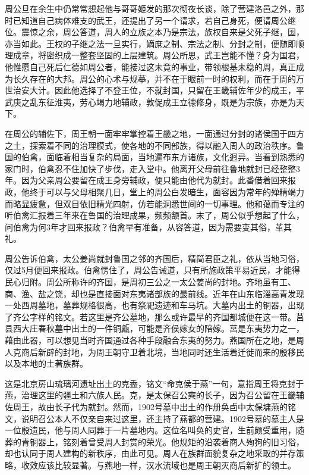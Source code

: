 周公旦在余生中仍常常想起他与哥哥姬发的那次彻夜长谈，除了营建洛邑之外，那时已知道自己病体难支的武王，还提出了另一个请求，若自己身死，便请周公继位。震惊之余，周公答道，周人的立族之本乃是宗法，族权自来是父死子继，国，亦当如此。王权的子继之法一旦实行，嫡庶之制、宗法之制、分封之制，便随即顺理成章，将密织成一整套坚固的上层建筑。周公所思，武王岂能不懂？身为国君，他惟愿自己死后仁德如周公者，能接过这未竟的事业，带领根基未稳的周，真正成为长久存在的大邦。周公的心术与规摹，并不在于眼前一时的权利，而在于周的万世治安大计。因此他选择了不登王位，不就封国，只留在王畿辅佐年少的成王，平武庚之乱东征淮夷，劳心竭力地辅政，敦促成王立德修身，既是为宗族，亦是为天下。

在周公的辅佐下，周王朝一面牢牢掌控着王畿之地，一面通过分封的诸侯国于四方之土，探索着不同的治理模式，使各地的不同部族，得以融入周人的政治秩序。鲁国的伯禽，面临着相当复杂的局面，当地遍布东方诸族，文化迥异。当看到熟悉的家门时，伯禽忍不住加快了步伐，走入堂中。他离开父母前往鲁地就封已经整整3年。因为父亲周公要留在成王身旁辅政，便只能由他代为就封。此番借着回来报政，他终于可以与父母相聚几日，堂上的周公白发暗生，面容因为常年的殚精竭力而略显疲惫，但双目依旧精光四射，仿若能洞悉世间的一切事理。他和蔼而专注的听伯禽汇报着三年来在鲁国的治理成果，频频颔首。末了，周公似乎想起了什么，问伯禽为何3年才回来报政？伯禽早有准备，从容答道，因为需要变其俗，革其礼。

周公告诉伯禽，太公姜尚就封鲁国之邻的齐国后，精简君臣之礼，依从当地习俗，仅过5月便回来报政。伯禽愣住了，周公告诫道，只有所施政策平易近民，才能得民心归附。周公所称许的齐国，是周初三公之一太公姜尚的封地。齐地虽有工、商、渔、盐之饶，却也是直接面对东夷诸部族的最前线。近年在山东临淄高青发现一处西周墓地，墓葬规格很高，也有祭祀遗迹和车马坑。大墓内出土的铜器，出现了齐公字样的铭文。若这里是齐公墓地，那么或许最早的齐国都城便在这一带。莒县西大庄春秋墓中出土的一件铜甗，可能是齐侯嫁女的陪嫁。莒是东夷势力之一，藉由此器，可以想见当时齐国通过各种手段融合东夷的努力。燕国所在之地，是周人克商后新辟的封地，为周王朝守卫着北境，当地同时还生活着迁徙而来的殷移民以及本地的土著族群。

这是北京房山琉璃河遗址出土的克盉，铭文“命克侯于燕”一句，意指周王将克封于燕，治理这里的疆土和六族人民。克，是太保召公奭的长子，因为召公留在王畿辅佐周王，故由长子代为就封。然而，1902号墓中出土的作册奂卣中太保墉燕的铭文，说明召公本人不仅亲自来过这里，还主持了燕都的营建。1902号墓的墓主人是一位殷遗民，他与周人同葬于一片墓地内。这位名叫奂的史官，生前颇受重用，随葬的青铜器上，铭刻着曾受周人封赏的荣光。他规矩的沿袭着商人殉狗的旧习俗，却也认同于周人建构的新秩序，由此可见。周人在族群面貌复杂之地采取的并存策略，收效应该比较显著。与燕地一样，汉水流域也是周王朝灭商后新扩的领土。

